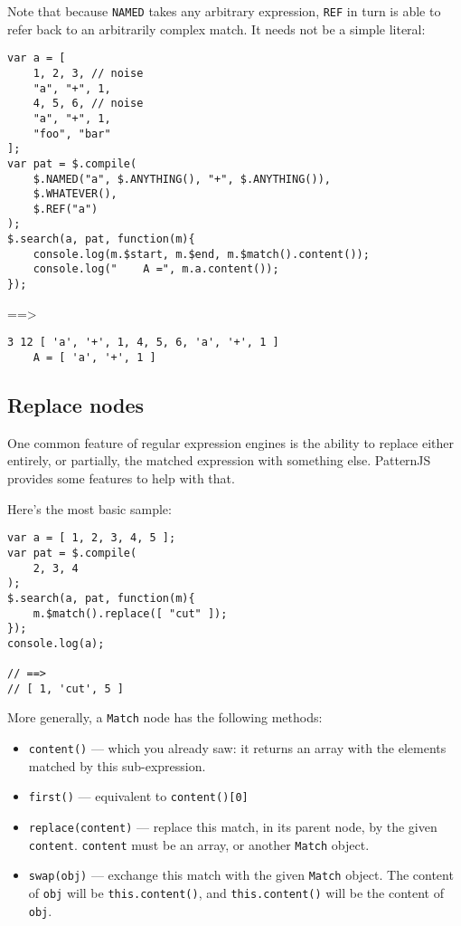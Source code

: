 \documentclass[a4paper,10pt]{article}
\begin{document}
Note that because \texttt{NAMED} takes any arbitrary expression, \texttt{REF} in turn is
able to refer back to an arbitrarily complex match.  It needs not be a
simple literal:


\begin{verbatim}
var a = [
    1, 2, 3, // noise
    "a", "+", 1,
    4, 5, 6, // noise
    "a", "+", 1,
    "foo", "bar"
];
var pat = $.compile(
    $.NAMED("a", $.ANYTHING(), "+", $.ANYTHING()),
    $.WHATEVER(),
    $.REF("a")
);
$.search(a, pat, function(m){
    console.log(m.$start, m.$end, m.$match().content());
    console.log("    A =", m.a.content());
});
\end{verbatim}

==>


\begin{verbatim}
3 12 [ 'a', '+', 1, 4, 5, 6, 'a', '+', 1 ]
    A = [ 'a', '+', 1 ]
\end{verbatim}
\subsection{Replace nodes}
\label{sec-2-9}


One common feature of regular expression engines is the ability to replace
either entirely, or partially, the matched expression with something else.
PatternJS provides some features to help with that.

Here's the most basic sample:


\begin{verbatim}
var a = [ 1, 2, 3, 4, 5 ];
var pat = $.compile(
    2, 3, 4
);
$.search(a, pat, function(m){
    m.$match().replace([ "cut" ]);
});
console.log(a);

// ==>
// [ 1, 'cut', 5 ]
\end{verbatim}

More generally, a \texttt{Match} node has the following methods:

\begin{itemize}
\item \texttt{content()} — which you already saw: it returns an array with the
  elements matched by this sub-expression.
\item \texttt{first()} — equivalent to \texttt{content()[0]}
\item \texttt{replace(content)} — replace this match, in its parent node, by the
  given \texttt{content}.  \texttt{content} must be an array, or another \texttt{Match} object.
\item \texttt{swap(obj)} — exchange this match with the given \texttt{Match} object.  The
  content of \texttt{obj} will be \texttt{this.content()}, and \texttt{this.content()} will be
  the content of \texttt{obj}.
\end{itemize}
\end{document}
